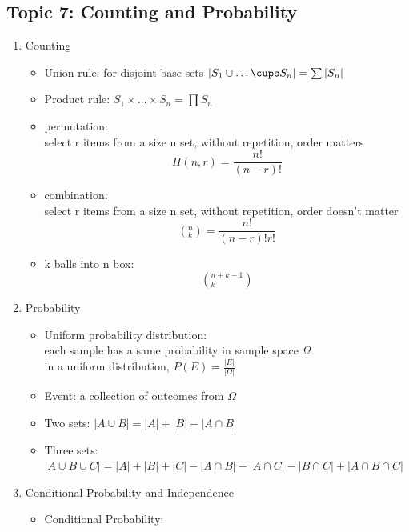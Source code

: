 \documentclass[11pt, a4paper]{article}
\begin{document}
\begin{multicols}{3}
\section*{Topic 7: Counting and Probability}
    \begin{enumerate}
        \item Counting
            \begin{itemize}
                \item Union rule: for disjoint base sets $|S_1 \cup \dots \cups S_n| = \sum {|S_n|}$
                \item Product rule: $S_1 \times \dots \times S_n = \prod {S_n}$ 
                \item permutation:\\
                    select r items from a size n set, without repetition, order matters
                    $$\Pi (n,r) = \frac {n!}{(n-r)!}$$
                \item combination:\\
                    select r items from a size n set, without repetition, order doesn't matter
                    $$(^{n}_{k})= \frac {n!}{(n-r)!r!}$$
                \item k balls into n box:\\
                    $$(^{n+k-1}_{k})$$
            \end{itemize}
        \item Probability
            \begin{itemize}
                \item Uniform probability distribution:\\
                    each sample has a same probability in sample space $\Omega$\\
                    in a uniform distribution, $P(E) = \frac {|E|}{|\Omega|}$
                \item Event: a collection of outcomes from $\Omega$
                \item Two sets: $|A \cup B| = |A| + |B| - |A \cap B|$
                \item Three sets: $|A \cup B \cup C| = |A| + |B| + |C| - |A \cap B| -|A \cap C| - |B \cap C| + |A \cap B \cap C|$
            \end{itemize}
        \item Conditional Probability and Independence
            \begin{itemize}
                \item Conditional Probability:\\

\end{itemize}
\end{enumerate}
\end{multicols}
\end{document}
